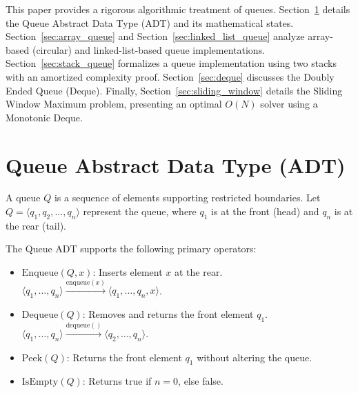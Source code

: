 \documentclass[10pt,journal,compsoc,onecolumn]{IEEEtran}
\begin{document}
This paper provides a rigorous algorithmic treatment of queues. Section~\ref{sec:queue_adt} details the Queue Abstract Data Type (ADT) and its mathematical states. Section~\ref{sec:array_queue} and Section~\ref{sec:linked_list_queue} analyze array-based (circular) and linked-list-based queue implementations. Section~\ref{sec:stack_queue} formalizes a queue implementation using two stacks with an amortized complexity proof. Section~\ref{sec:deque} discusses the Doubly Ended Queue (Deque). Finally, Section~\ref{sec:sliding_window} details the Sliding Window Maximum problem, presenting an optimal $O(N)$ solver using a Monotonic Deque.

\section{Queue Abstract Data Type (ADT)}
\label{sec:queue_adt}
A queue $Q$ is a sequence of elements supporting restricted boundaries. Let $Q = \langle q_1, q_2, \ldots, q_n \rangle$ represent the queue, where $q_1$ is at the front (head) and $q_n$ is at the rear (tail).

The Queue ADT supports the following primary operators:
\begin{itemize}
    \item $\mathrm{Enqueue}(Q, x)$: Inserts element $x$ at the rear.
    $\langle q_1, \ldots, q_n \rangle \xrightarrow{\mathrm{enqueue}(x)} \langle q_1, \ldots, q_n, x \rangle$.
    \item $\mathrm{Dequeue}(Q)$: Removes and returns the front element $q_1$.
    $\langle q_1, \ldots, q_n \rangle \xrightarrow{\mathrm{dequeue}()} \langle q_2, \ldots, q_n \rangle$.
    \item $\mathrm{Peek}(Q)$: Returns the front element $q_1$ without altering the queue.
    \item $\mathrm{IsEmpty}(Q)$: Returns true if $n = 0$, else false.
\end{itemize}
\end{document}
